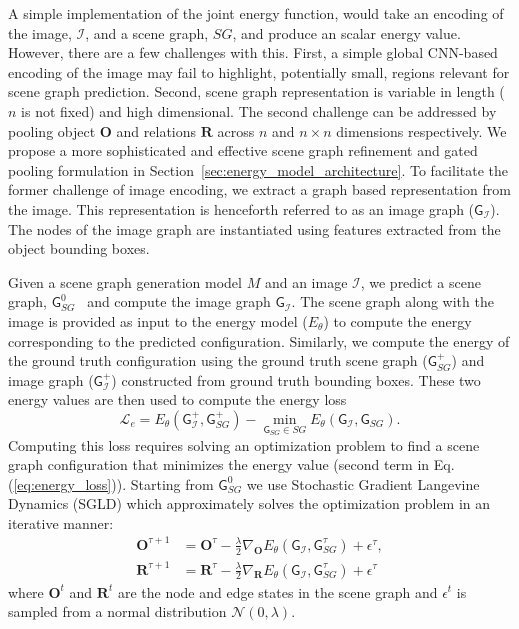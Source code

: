 \documentclass[final]{cvpr}
\newcommand{\imagerep}{\mathcal{I}}
\newcommand{\objectlabelrepeq}{\mathbf{O}}
\newcommand{\relationlabelrepeq}{\mathbf{R}}
\newcommand{\imagegraph}{$\mathsf{G}_{\imagerep}$}
\newcommand{\imagegrapheq}{\mathsf{G}_{\imagerep}}
\newcommand{\scenegrapheq}{\mathsf{G}_{SG}}
\begin{document}
A simple implementation of the joint energy function, would take an encoding of the image, $\imagerep$, and a scene graph, $SG$, and produce an scalar energy value. However, there are a few challenges with this. First, a simple global CNN-based encoding of the image may fail to highlight, potentially small, regions relevant for scene graph prediction. Second, scene graph representation is variable in length ($n$ is not fixed) and high dimensional. The second challenge can be addressed by pooling object $\objectlabelrepeq$ and relations $\relationlabelrepeq$ across $n$ and $n \times n$ dimensions respectively. We propose a more sophisticated and effective scene graph refinement and gated pooling formulation in  Section~\ref{sec:energy_model_architecture}. 
To facilitate the former challenge of image encoding, we extract a graph based representation from the image.
This representation is henceforth referred to as an image graph (\imagegraph).
The nodes of the image graph are instantiated using features extracted from the object bounding boxes.




Given a scene graph generation model $M$ and an image $\imagerep$, we predict a scene graph, $\scenegrapheq^{0}$ \  and compute the image graph \imagegraph. The scene graph along with the image is provided as input to the energy model ($E_{\theta}$) to compute the energy corresponding to the predicted configuration. Similarly, we compute the energy of the ground truth configuration using the ground truth scene graph  ($\scenegrapheq^{+}$) and image graph ($\imagegrapheq^{+}$) constructed from ground truth bounding boxes.  These two energy values are then used to compute the energy loss
\begin{equation}
    \mathcal{L}_{e} = E_{\theta}(\imagegrapheq^{+}, \scenegrapheq^{+}) - \min_{\scenegrapheq \in SG} E_{\theta}(\imagegrapheq, \scenegrapheq). 
\label{eq:energy_loss}
\end{equation}
Computing this loss requires solving an optimization problem to find a scene graph configuration that minimizes the energy value (second term in Eq.(\ref{eq:energy_loss})). Starting from $\scenegrapheq^{0}$ we use Stochastic Gradient Langevine Dynamics (SGLD) \cite{welling2011bayesian} which approximately solves the optimization problem in an iterative manner: \begin{align}
\objectlabelrepeq^{\tau+1} &= \objectlabelrepeq^{\tau} - \frac{\lambda}{2} \nabla_{\objectlabelrepeq}E_{\theta}(\imagegrapheq, \scenegrapheq^{\tau}) + \epsilon^{\tau},  \nonumber \\
\relationlabelrepeq^{\tau+1} &= \relationlabelrepeq^{\tau} - \frac{\lambda}{2} \nabla_{\relationlabelrepeq}E_{\theta}(\imagegrapheq, \scenegrapheq^{\tau}) + \epsilon^{\tau}
\label{eq:sgld}
\end{align}
where $\objectlabelrepeq^{t}$ and $\relationlabelrepeq^{t}$ are the node and edge states in the scene graph and $\epsilon^{t}$ is sampled from a normal distribution $\mathcal{N}(0,\lambda)$. 
\end{document}
